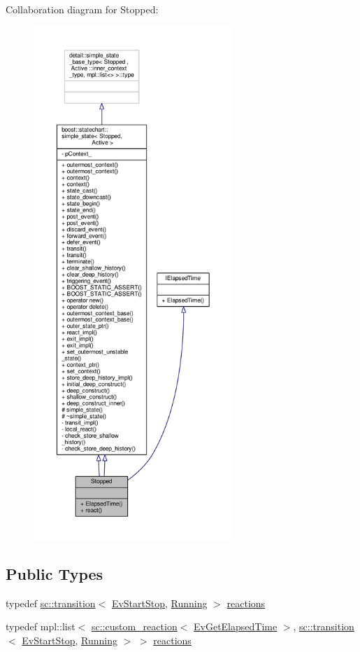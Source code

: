 Collaboration diagram for Stopped\+:
\nopagebreak
\begin{figure}[H]
\begin{center}
\leavevmode
\includegraphics[height=550pt]{struct_stopped__coll__graph}
\end{center}
\end{figure}
\subsection*{Public Types}
\begin{DoxyCompactItemize}
\item 
typedef \mbox{\hyperlink{classboost_1_1statechart_1_1transition}{sc\+::transition}}$<$ \mbox{\hyperlink{struct_ev_start_stop}{Ev\+Start\+Stop}}, \mbox{\hyperlink{struct_running}{Running}} $>$ \mbox{\hyperlink{struct_stopped_aff133f8a64cf04b86fd197236f8bf3a7}{reactions}}
\item 
typedef mpl\+::list$<$ \mbox{\hyperlink{classboost_1_1statechart_1_1custom__reaction}{sc\+::custom\+\_\+reaction}}$<$ \mbox{\hyperlink{struct_ev_get_elapsed_time}{Ev\+Get\+Elapsed\+Time}} $>$, \mbox{\hyperlink{classboost_1_1statechart_1_1transition}{sc\+::transition}}$<$ \mbox{\hyperlink{struct_ev_start_stop}{Ev\+Start\+Stop}}, \mbox{\hyperlink{struct_running}{Running}} $>$ $>$ \mbox{\hyperlink{struct_stopped_ad1c749c4a4613371eaf9b98be5fa34a2}{reactions}}
\end{DoxyCompactItemize}
